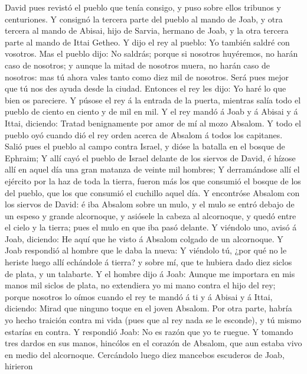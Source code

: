  David pues revistó el pueblo que tenía consigo, y puso
sobre ellos tribunos y centuriones.  Y consignó la tercera
parte del pueblo al mando de Joab, y otra tercera al mando de Abisai,
hijo de Sarvia, hermano de Joab, y la otra tercera parte al mando de
Ittai Getheo. Y dijo el rey al pueblo: Yo también saldré con vosotros.
 Mas el pueblo dijo: No saldrás; porque si nosotros
huyéremos, no harán caso de nosotros; y aunque la mitad de nosotros
muera, no harán caso de nosotros: mas tú ahora vales tanto como diez mil
de nosotros. Será pues mejor que tú nos des ayuda desde la ciudad.
 Entonces el rey les dijo: Yo haré lo que bien os pareciere.
Y púsose el rey á la entrada de la puerta, mientras salía todo el pueblo
de ciento en ciento y de mil en mil.  Y el rey mandó á Joab
y á Abisai y á Ittai, diciendo: Tratad benignamente por amor de mí al
mozo Absalom. Y todo el pueblo oyó cuando dió el rey orden acerca de
Absalom á todos los capitanes.  Salió pues el pueblo al
campo contra Israel, y dióse la batalla en el bosque de Ephraim;
 Y allí cayó el pueblo de Israel delante de los siervos de
David, é hízose allí en aquel día una gran matanza de veinte mil
hombres;  Y derramándose allí el ejército por la haz de toda
la tierra, fueron más los que consumió el bosque de los del pueblo, que
los que consumió el cuchillo aquel día.  Y encontróse
Absalom con los siervos de David: é iba Absalom sobre un mulo, y el mulo
se entró debajo de un espeso y grande alcornoque, y asiósele la cabeza
al alcornoque, y quedó entre el cielo y la tierra; pues el mulo en que
iba pasó delante.  Y viéndolo uno, avisó á Joab, diciendo:
He aquí que he visto á Absalom colgado de un alcornoque.  Y
Joab respondió al hombre que le daba la nueva: Y viéndolo tú, ¿por qué
no le heriste luego allí echándole á tierra? y sobre mí, que te hubiera
dado diez siclos de plata, y un talabarte.  Y el hombre
dijo á Joab: Aunque me importara en mis manos mil siclos de plata, no
extendiera yo mi mano contra el hijo del rey; porque nosotros lo oímos
cuando el rey te mandó á ti y á Abisai y á Ittai, diciendo: Mirad que
ninguno toque en el joven Absalom.  Por otra parte, habría
yo hecho traición contra mi vida (pues que al rey nada se le esconde), y
tú mismo estarías en contra.  Y respondió Joab: No es razón
que yo te ruegue. Y tomando tres dardos en sus manos, hincólos en el
corazón de Absalom, que aun estaba vivo en medio del alcornoque.
 Cercándolo luego diez mancebos escuderos de Joab, hirieron

